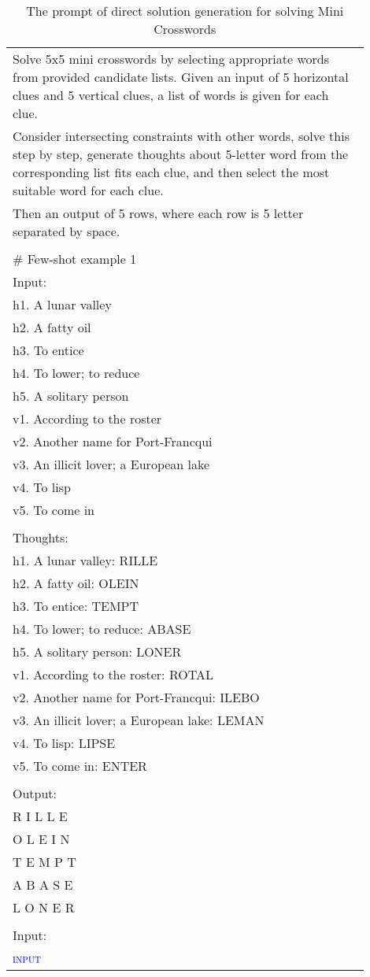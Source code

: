 \begin{table*}[ht]
\small
\centering
\caption{The prompt of direct solution generation for solving Mini Crosswords}
\begin{tabular}{p{0.9\linewidth}} \toprule
Solve 5x5 mini crosswords by selecting appropriate words from provided candidate lists. Given an input of 5 horizontal clues and 5 vertical clues, a list of words is given for each clue. \\
Consider intersecting constraints with other words, solve this step by step, generate thoughts about 5-letter word from the corresponding list fits each clue, and then select the most suitable word for each clue.\\
Then an output of 5 rows, where each row is 5 letter separated by space.\\
\\
\# Few-shot example 1\\
Input:\\
h1. A lunar valley\\
h2. A fatty oil\\
h3. To entice\\
h4. To lower; to reduce\\
h5. A solitary person\\
v1. According to the roster\\
v2. Another name for Port-Francqui\\
v3. An illicit lover; a European lake\\
v4. To lisp\\
v5. To come in\\
\\
Thoughts:\\
h1. A lunar valley: RILLE\\
h2. A fatty oil: OLEIN\\
h3. To entice: TEMPT\\
h4. To lower; to reduce: ABASE\\
h5. A solitary person: LONER\\
v1. According to the roster: ROTAL\\
v2. Another name for Port-Francqui: ILEBO\\
v3. An illicit lover; a European lake: LEMAN\\
v4. To lisp: LIPSE\\
v5. To come in: ENTER\\
\\
Output:\\
R I L L E\\
O L E I N\\
T E M P T\\
A B A S E\\
L O N E R\\
\\
Input:\\
\textcolor{blue}{\textsc{input}}
\\ \bottomrule
\end{tabular}
\label{tab:direct_solution_generation_crosswords}
\end{table*}

